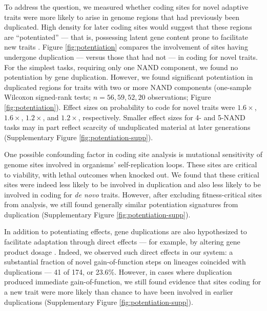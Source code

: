 To address the question, we measured whether coding sites for novel adaptive traits were more likely to arise in genome regions that had previously been duplicated.
High density for later coding sites would suggest that these regions are ``potentiated'' --- that is, possessing latent gene content prone to facilitate new traits \citep{Ferguson2023,Quandt2015,Blount2008}.
Figure \ref{fig:potentiation} compares the involvement of sites having undergone duplication --- versus those that had not --- in coding for novel traits.
For the simplest tasks, requiring only one NAND component, we found no potentiation by gene duplication.
However, we found significant potentiation in duplicated regions for traits with two or more NAND components (one-sample Wilcoxon signed-rank tests; $n=56,59,52,20$ observations; Figure \ref{fig:potentiation}).
Effect sizes on probability to code for novel traits were $1.6\times$, $1.6\times$, $1.2\times$, and $1.2\times$, respectively.
Smaller effect sizes for 4- and 5-NAND tasks may in part reflect scarcity of unduplicated material at later generations (Supplementary Figure \ref{fig:potentiation-supp}).

One possible confounding factor in coding site analysis is mutational sensitivity of genome sites involved in organisms' self-replication loops.
These sites are critical to viability, with lethal outcomes when knocked out.
We found that these critical sites were indeed less likely to be involved in duplication and also less likely to be involved in coding for \textit{de novo} traits.
However, after excluding fitness-critical sites from analysis, we still found generally similar potentiation signatures from duplication (Supplementary Figure \ref{fig:potentiation-supp}).

In addition to potentiating effects, gene duplications are also hypothesized to facilitate adaptation through direct effects --- for example, by altering gene product dosage \citep{kondrashov2012gene}.
Indeed, we observed such direct effects in our system: a substantial fraction of novel gain-of-function steps on lineages coincided with duplications --- 41 of 174, or 23.6\%.
However, in cases where duplication produced immediate gain-of-function, we still found evidence that sites coding for a new trait were more likely than chance to have been involved in earlier duplications (Supplementary Figure \ref{fig:potentiation-supp}).

